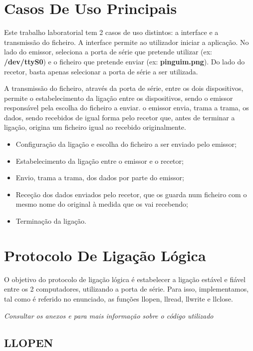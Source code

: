 \documentclass[11pt]{article}
\begin{document}
\section{Casos De Uso Principais}

Este trabalho laboratorial tem 2 casos de uso distintos: a interface e a transmissão do ficheiro.
A interface permite ao utilizador iniciar a aplicação. No lado do emissor, seleciona a porta de série que pretende utilizar (ex: \textbf{/dev/ttyS0}) e o ficheiro que pretende enviar (ex: \textbf{pinguim.png}). Do lado do recetor, basta apenas selecionar a porta de série a ser utilizada.

A transmissão do ficheiro, através da porta de série, entre os dois dispositivos, permite o estabelecimento da ligação entre os dispositivos, sendo o emissor responsável pela escolha do ficheiro a enviar. o emissor envia, trama a trama, os dados, sendo recebidos de igual forma pelo recetor que, antes de terminar a ligação, origina um ficheiro igual ao recebido originalmente.

\begin{itemize}
	\item Configuração da ligação e escolha do ficheiro a ser enviado pelo emissor;
	\item Estabelecimento da ligação entre o emissor e o recetor;
	\item Envio, trama a trama, dos dados por parte do emissor;
	\item Receção dos dados enviados pelo recetor, que os guarda num ficheiro com o mesmo nome do original à medida que os vai recebendo;
	\item Terminação da ligação.

\end{itemize}

\section{Protocolo De Ligação Lógica}

O objetivo do protocolo de ligação lógica é estabelecer a ligação estável e fiável entre os 2 computadores, utilizando a porta de série. Para isso, implementamos, tal como é referido no enunciado, as funções llopen, llread, llwrite e llclose.

\textit{Consultar os anexos  e  para mais informação sobre o código utilizado }

\subsection{LLOPEN}
\end{document}
